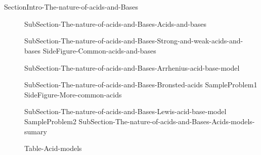 \documentclass[main.tex]{subfiles}
\newcommand\chapterlabel{Ch-acidbase}\setcounter{figurenewcounter}{0}\setcounter{tablenewcounter}{0}\setcounter{formulanewcounter}{0}
\begin{document}
\section{\color{blue!30!black}{The nature of acids and Bases}}{SectionIntro-The-nature-of-acids-and-Bases}
\sloppy
\begin{description}
  \item[]  {SubSection-The-nature-of-acids-and-Bases-Acids-and-bases}
   \item[] {SubSection-The-nature-of-acids-and-Bases-Strong-and-weak-acids-and-bases} 
           {SideFigure-Common-acids-and-bases}
  \item[] {SubSection-The-nature-of-acids-and-Bases-Arrhenius-acid-base-model}
\item[]{SubSection-The-nature-of-acids-and-Bases-Bronsted-acids}
  {SampleProblem1}
 {SideFigure-More-common-acids}
\item[]{SubSection-The-nature-of-acids-and-Bases-Lewis-acid-base-model}
   {SampleProblem2}
{SubSection-The-nature-of-acids-and-Bases-Acids-models-sumary} 
 \begin{center} {Table-Acid-models}\end{center}
\end{description}
\end{document}
